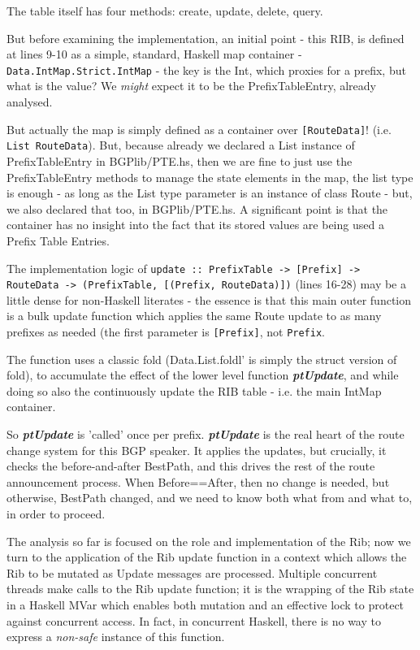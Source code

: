 The table itself has four methods: create, update, delete, query.

But before examining the implementation, an initial point - this RIB, is defined at lines 9-10  as a simple, standard, Haskell map container -  \lstinline{Data.IntMap.Strict.IntMap} - the key is the Int, which proxies for a prefix, but what is the value?  We \textit{might} expect it to be the PrefixTableEntry, already analysed.

But actually the map is simply defined as a container over \verb|[RouteData]|! 
(i.e. \verb|List RouteData|).
But, because already we declared a List instance of PrefixTableEntry in BGPlib/PTE.hs, then we are fine to just use the PrefixTableEntry methods to manage the state elements in the map, the list type is enough - as long as the List type parameter is an instance of class Route - but, we also declared that too, in BGPlib/PTE.hs.  A significant point is that the container has no insight into the fact that its stored values are being used a Prefix Table Entries.

The implementation logic of \verb|update :: PrefixTable -> [Prefix] -> RouteData -> (PrefixTable, [(Prefix, RouteData)])| (lines 16-28) may be  a little dense for non-Haskell literates - the essence is that this main outer function is a bulk update function which applies the same Route update to as many prefixes as needed (the first parameter is \verb|[Prefix]|, not \verb|Prefix|.

The function uses a classic fold (Data.List.foldl' is simply the struct version of fold), to accumulate the effect of the lower level function  \textit{\textbf{ptUpdate}}, and while doing so also the continuously update the RIB table - i.e. the main IntMap container.

So \textit{\textbf{ptUpdate}} is 'called' once per prefix.   \textit{\textbf{ptUpdate}} is the real heart of the route change system for this BGP speaker.  It applies the updates, but crucially, it checks the before-and-after BestPath, and this drives the rest of the route announcement process.  When Before==After, then no change is needed, but otherwise, BestPath changed, and we need to know both what from and what to, in order to proceed.

\bigskip

The analysis so far is focused on the role and implementation of the Rib; now we turn to the application of the Rib update function in a context which allows the Rib to be mutated as Update messages are processed.  Multiple concurrent threads make calls to the Rib update function; it is  the wrapping of the Rib state in a Haskell MVar which enables both mutation and an effective lock to protect against concurrent access.  In fact, in concurrent Haskell, there is no way to express a \textit{non-safe} instance of this function. 

